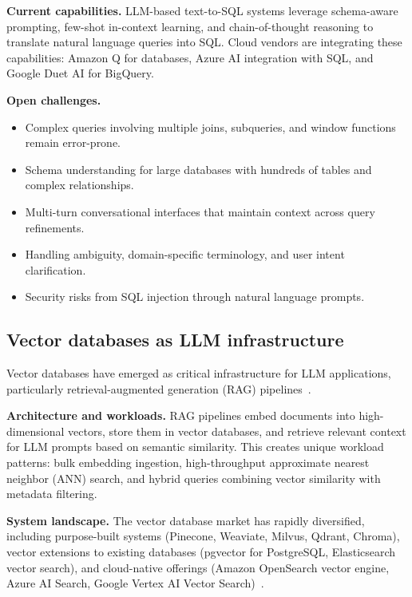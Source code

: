 \documentclass[a4paper,fleqn]{cas-sc}
\begin{document}
\textbf{Current capabilities.} LLM-based text-to-SQL systems leverage schema-aware prompting, few-shot in-context learning, and chain-of-thought reasoning to translate natural language queries into SQL. Cloud vendors are integrating these capabilities: Amazon Q for databases, Azure AI integration with SQL, and Google Duet AI for BigQuery.

\textbf{Open challenges.}
\begin{itemize}
    \item Complex queries involving multiple joins, subqueries, and window functions remain error-prone.
    \item Schema understanding for large databases with hundreds of tables and complex relationships.
    \item Multi-turn conversational interfaces that maintain context across query refinements.
    \item Handling ambiguity, domain-specific terminology, and user intent clarification.
    \item Security risks from SQL injection through natural language prompts.
\end{itemize}

\subsection{Vector databases as LLM infrastructure}
\label{subsec:vectordb}

Vector databases have emerged as critical infrastructure for LLM applications, particularly retrieval-augmented generation (RAG) pipelines~\cite{Pan2024VectorDB}.

\textbf{Architecture and workloads.} RAG pipelines embed documents into high-dimensional vectors, store them in vector databases, and retrieve relevant context for LLM prompts based on semantic similarity. This creates unique workload patterns: bulk embedding ingestion, high-throughput approximate nearest neighbor (ANN) search, and hybrid queries combining vector similarity with metadata filtering.

\textbf{System landscape.} The vector database market has rapidly diversified, including purpose-built systems (Pinecone, Weaviate, Milvus, Qdrant, Chroma), vector extensions to existing databases (pgvector for PostgreSQL, Elasticsearch vector search), and cloud-native offerings (Amazon OpenSearch vector engine, Azure AI Search, Google Vertex AI Vector Search)~\cite{Pan2024VectorDB}.
\end{document}
